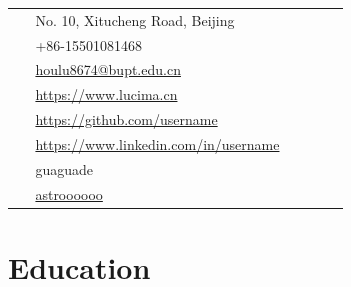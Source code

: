 \documentclass[10pt]{article} %
\begin{document}
\begin{paracol}{2}
\switchcolumn %


\parbox[top][0.12\textheight][c]{\linewidth}{ %
	\vspace{-0.04\textheight} %
	\colorbox{shade}{ %
		\begin{supertabular}{p{0.05\linewidth}|p{0.775\linewidth}} %
			\raisebox{-1pt}{\faHome} & No. 10, Xitucheng Road, Beijing \\ %
			\raisebox{-1pt}{\faPhone} & +86-15501081468 \\ %
			\raisebox{0pt}{\small\faEnvelope} & \href{mailto:houlu8674@bupt.edu.cn}{houlu8674@bupt.edu.cn} \\ %
			\raisebox{-1pt}{\small\faDesktop} & \href{https://www.lucima.cn}{https://www.lucima.cn} \\ %
			\raisebox{-1pt}{\faGithub} & \href{https://github.com/username}{https://github.com/username} \\ %
			\raisebox{-1pt}{\faLinkedinSquare} & \href{https://www.linkedin.com/in/username}{https://www.linkedin.com/in/username} \\ %
			\raisebox{-1pt}{\faWechat} &
			guaguade\\
			\raisebox{-1pt}{\faWeibo} &
			\href{http://weibo.com/lucima}{astroooooo}\\
		\end{supertabular}
	}
}


\section{Education} 



\end{paracol}
\end{document}
